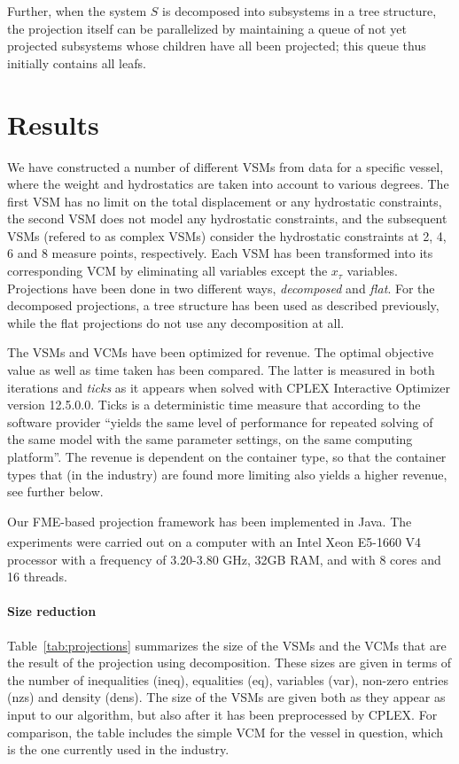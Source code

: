 \documentclass{llncs}
\begin{document}
Further, when the system $S$ is decomposed into subsystems in a tree structure, the projection itself can be parallelized by maintaining a queue of not yet projected subsystems whose children have all been projected; this queue thus initially contains all leafs. 
  
\section{Results}\label{sec:results}
We have constructed a number of different VSMs from data for a specific vessel, where the weight and hydrostatics are taken into account to various degrees. The first VSM has no limit on the total displacement or any hydrostatic constraints, the second VSM does not model any hydrostatic constraints, and the subsequent VSMs (refered to as complex VSMs) consider the hydrostatic constraints at 2, 4, 6 and 8 measure points, respectively. 
Each VSM has been transformed into its corresponding VCM by eliminating all variables except the $x_\tau$ variables. Projections have been done in two different ways, \emph{decomposed} and \emph{flat}. For the decomposed projections, a tree structure has been used as described previously, while the flat projections do not use any decomposition at all. 

The VSMs and VCMs have been optimized for revenue. The optimal objective value as well as time taken has been compared. The latter is measured in both iterations and \emph{ticks} as it appears when solved with CPLEX Interactive Optimizer version 12.5.0.0. Ticks is a deterministic time measure that according to the software provider ``yields the same level of performance for repeated solving of the same model with the same parameter settings, on the same computing platform''. The revenue is dependent on the container type, so that the container types that (in the industry) are found more limiting also yields a higher revenue, see further below. 

Our FME-based projection framework has been implemented in Java. The experiments were carried out on a computer with an {Intel\textsuperscript{\textregistered} Xeon\textsuperscript{\textregistered} E5-1660 V4 processor with a frequency of 3.20-3.80 GHz, 32GB RAM, and with 8 cores and 16 threads.}

\paragraph{Size reduction}
Table~\ref{tab:projections} summarizes the size of the VSMs and the VCMs that are the result of the projection using decomposition. These sizes are given in terms of the number of inequalities (ineq), equalities (eq), variables (var), non-zero entries (nzs) and density (dens). The size of the VSMs are given both as they appear as input to our algorithm, but also after it has been preprocessed by CPLEX. For comparison, the table includes the simple VCM for the vessel in question, which is the one currently used in the industry. %
\end{document}
